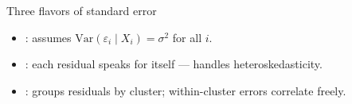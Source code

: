 \documentclass[aspectratio=169,11pt]{beamer}
\begin{document}

\begin{frame}{Three flavors of standard error}
\vspace{0.6em}
\begin{itemize}
  \item {}: assumes $\text{Var}(\varepsilon_i \mid X_i) = \sigma^2$ for all $i$.
  \item {}: each residual speaks for itself --- handles heteroskedasticity.
  \item {}: groups residuals by cluster; within-cluster errors correlate freely.
\end{itemize}
\vspace{0.6em}
\end{frame}
\end{document}
